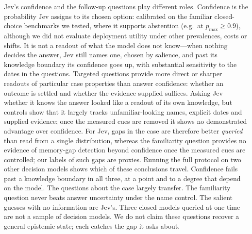 \documentclass[10pt,twocolumn]{article}
\newcommand{\pmax}{p_{\max}}
\begin{document}
Jev's confidence and the follow-up questions play different roles.
Confidence is the probability Jev assigns to its chosen option: calibrated
on the familiar closed-choice benchmarks we tested, where it supports
abstention (e.g.\ at $\pmax\ge0.9$), although we did not evaluate deployment
utility under other prevalences, costs or shifts. It is not a readout of what the model does not know---when
nothing decides the answer, Jev still names one, chosen by salience, and past
its knowledge boundary its confidence goes up, with substantial sensitivity
to the dates in the questions. Targeted questions provide more direct or
sharper readouts of particular case properties than answer confidence:
whether an outcome is settled and whether the evidence supplied suffices. Asking Jev whether it
knows the answer looked like a readout of its own knowledge, but controls show
that it largely tracks unfamiliar-looking names, explicit dates and supplied
evidence; once the measured cues are removed it shows no demonstrated
advantage over confidence. For Jev, gaps in the case are therefore better
\emph{queried} than read from a single distribution, whereas the familiarity
question provides no evidence of memory-gap detection beyond confidence once
the measured cues are controlled; our labels of such gaps are proxies.
Running the full protocol on two other decision models shows which of these
conclusions travel. Confidence fails past a knowledge boundary in all three,
at a point and to a degree that depend on the model. The questions about the
case largely transfer. The familiarity question never beats answer
uncertainty under the name control. The salient guesses with no information
are Jev's. Three closed models queried at one time are not a sample of
decision models. We do not claim
these questions recover a general epistemic state; each catches the gap it
asks about.
\end{document}
